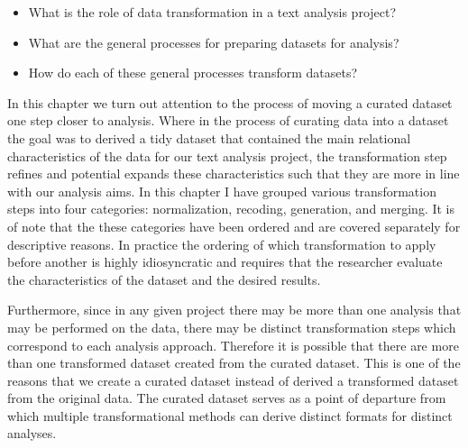 \documentclass[
  letterpaper,
]{scrbook}
\providecommand{\tightlist}{%
  \setlength{\itemsep}{0pt}\setlength{\parskip}{0pt}}\usepackage{longtable,booktabs,array}
\begin{document}
\begin{tcolorbox}[enhanced jigsaw, title=\textcolor{quarto-callout-note-color}{\faInfo}\hspace{0.5em}{Keys}, titlerule=0mm, toptitle=1mm, colbacktitle=quarto-callout-note-color!10!white, bottomtitle=1mm, left=2mm, colframe=quarto-callout-note-color-frame, breakable, toprule=.15mm, colback=white, opacitybacktitle=0.6, leftrule=.75mm, rightrule=.15mm, bottomrule=.15mm, arc=.35mm, coltitle=black, opacityback=0]

\begin{itemize}
\tightlist
\item
  What is the role of data transformation in a text analysis project?
\item
  What are the general processes for preparing datasets for analysis?
\item
  How do each of these general processes transform datasets?
\end{itemize}

\end{tcolorbox}

In this chapter we turn out attention to the process of moving a curated
dataset one step closer to analysis. Where in the process of curating
data into a dataset the goal was to derived a tidy dataset that
contained the main relational characteristics of the data for our text
analysis project, the transformation step refines and potential expands
these characteristics such that they are more in line with our analysis
aims. In this chapter I have grouped various transformation steps into
four categories: normalization, recoding, generation, and merging. It is
of note that the these categories have been ordered and are covered
separately for descriptive reasons. In practice the ordering of which
transformation to apply before another is highly idiosyncratic and
requires that the researcher evaluate the characteristics of the dataset
and the desired results.

Furthermore, since in any given project there may be more than one
analysis that may be performed on the data, there may be distinct
transformation steps which correspond to each analysis approach.
Therefore it is possible that there are more than one transformed
dataset created from the curated dataset. This is one of the reasons
that we create a curated dataset instead of derived a transformed
dataset from the original data. The curated dataset serves as a point of
departure from which multiple transformational methods can derive
distinct formats for distinct analyses.
\end{document}
